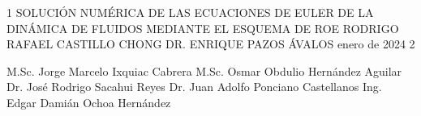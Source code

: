 \documentclass[letterpaper,12pt]{thesisECFM}
\begin{document}
\datosThesis%
{1}%
{SOLUCIÓN NUMÉRICA DE LAS ECUACIONES DE EULER DE LA DINÁMICA DE FLUIDOS MEDIANTE EL ESQUEMA DE ROE}%
{RODRIGO RAFAEL CASTILLO CHONG}%
{DR. ENRIQUE PAZOS ÁVALOS}%
{enero de 2024}		%
{2}							%

\examenPrivado%
{M.Sc. Jorge Marcelo Ixquiac Cabrera}%
{M.Sc. Osmar Obdulio Hernández Aguilar}%
{Dr. José Rodrigo Sacahui Reyes}%
{ Dr. Juan Adolfo Ponciano Castellanos}%
{Ing. Edgar Damián Ochoa Hernández}%
{\onehalfspacing	%
	
	
	
	
	\par}
 
\frontmatter    %

{\onehalfspacing	%

\tableofcontents    %





\mainmatter     %








{\backmatter     %


\renewcommand{\bibname}{BIBLIOGRAF\'IA}
\nocite{*}			%


}


%

\par}               %
\end{document}
